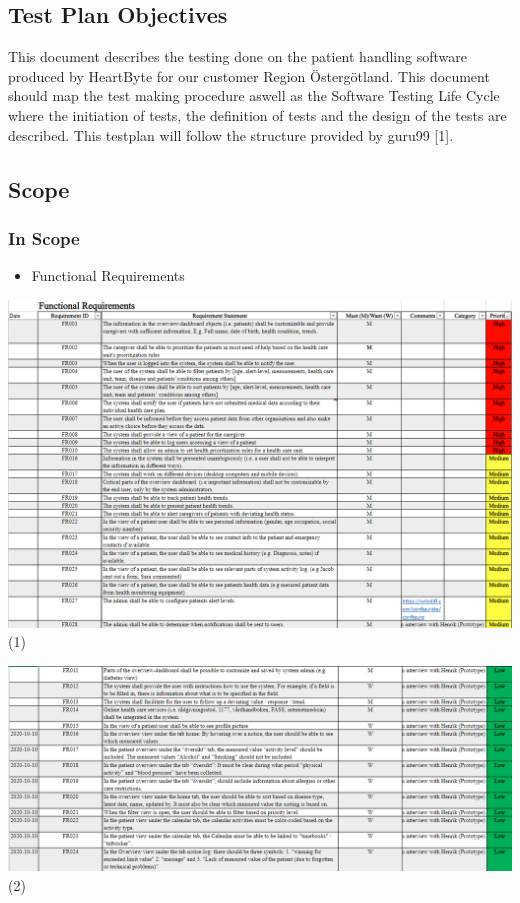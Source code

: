 
\subsection{Test Plan Objectives}
This document describes the testing done on the patient handling software produced by HeartByte for our customer Region Östergötland. This document should map the test making procedure aswell as the Software Testing Life Cycle where the initiation of tests, the definition of tests and the design of the tests are described. This testplan will follow the structure provided by guru99 [1].

\subsection{Scope}
\subsubsection{In Scope}

\begin{itemize}
  \item Functional Requirements
\end{itemize}
  \vfill
\includegraphics[width=\linewidth]{Pictures/Func1} (1)

    \vfill
    \vfill
\includegraphics[width=\linewidth]{Pictures/Func2} (2)


